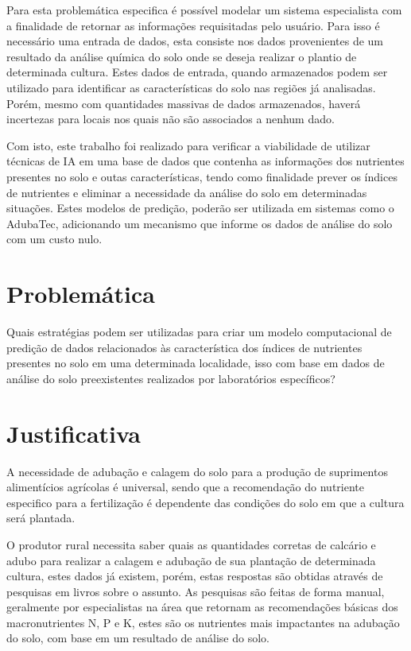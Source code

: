 \documentclass[
12pt,				%
oneside,			%
a4paper,			%
english,			%
french,				%
spanish,			%
brazil				%
]{abntex2}
\begin{document}
Para esta problemática especifica é possível modelar um sistema especialista com a finalidade de retornar as informações requisitadas pelo usuário. Para isso é necessário uma entrada de dados, esta consiste nos dados provenientes de um resultado da análise química do solo onde se deseja realizar o plantio de determinada cultura. Estes dados de entrada, quando armazenados podem ser utilizado para identificar as características do solo nas regiões já analisadas. Porém, mesmo com quantidades massivas de dados armazenados, haverá incertezas para locais nos quais não são associados a nenhum dado.

Com isto, este trabalho foi realizado para verificar a viabilidade de utilizar técnicas de IA em uma base de dados que contenha as informações dos nutrientes presentes no solo e outas características, tendo como finalidade prever os índices de nutrientes e eliminar a necessidade da análise do solo em determinadas situações. Estes modelos de predição, poderão ser utilizada em sistemas como o AdubaTec, adicionando um mecanismo que informe os dados de análise do solo com um custo nulo.


\pagebreak


\section{Problemática}

Quais estratégias podem ser utilizadas para criar um modelo computacional de predição de dados relacionados às característica dos índices de nutrientes presentes no solo em uma determinada localidade, isso com base em dados de análise do solo preexistentes realizados por laboratórios específicos? 

\section{Justificativa}

A necessidade de adubação e calagem do solo para a produção de suprimentos alimentícios agrícolas é universal, sendo que a recomendação do nutriente especifico para a fertilização é dependente das condições do solo em que a cultura será plantada.

O produtor rural necessita saber quais as quantidades corretas de calcário e adubo para realizar a calagem e adubação de sua plantação de determinada cultura, estes dados já existem, porém, estas respostas são obtidas através de pesquisas em livros sobre o assunto. As pesquisas são feitas de forma manual, geralmente por especialistas na área que retornam as recomendações básicas dos macronutrientes N, P e K, estes são os nutrientes mais impactantes na adubação do solo, com base em um resultado de análise do solo. \cite{borges2009recomendaccoes}
\end{document}
